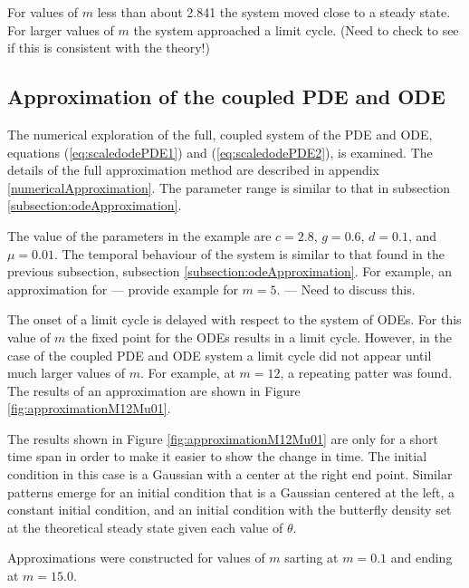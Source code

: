 \documentclass[12pt]{article}
\begin{document}
For values of $m$ less than about 2.841 the system moved close to a
steady state. For larger values of $m$ the system approached a limit
cycle. (Need to check to see if this is consistent with the theory!)

\subsection{Approximation of the coupled PDE and ODE}

The numerical exploration of the full, coupled system of the PDE and
ODE, equations (\ref{eq:scaledodePDE1}) and (\ref{eq:scaledodePDE2}),
is examined. The details of the full approximation method are
described in appendix \ref{numericalApproximation}. The parameter
range is similar to that in subsection
\ref{subsection:odeApproximation}.

The value of the parameters in the example are $c=2.8$, $g=0.6$,
$d=0.1$, and $\mu=0.01$. The temporal behaviour of the system is
similar to that found in the previous subsection, subsection
\ref{subsection:odeApproximation}. For example, an approximation for
--- provide example for $m=5$. --- Need to discuss this.

The onset of a limit cycle is delayed with respect to the system of
ODEs. For this value of $m$ the fixed point for the ODEs results in a
limit cycle. However, in the case of the coupled PDE and ODE system a
limit cycle did not appear until much larger values of $m$. For
example, at $m=12$, a repeating patter was found. The results of an
approximation are shown in Figure \ref{fig:approximationM12Mu01}.

The results shown in Figure \ref{fig:approximationM12Mu01} are only
for a short time span in order to make it easier to show the change in
time. The initial condition in this case is a Gaussian with a center
at the right end point.  Similar patterns emerge for an initial
condition that is a Gaussian centered at the left, a constant initial
condition, and an initial condition with the butterfly density set at
the theoretical steady state given each value of $\theta$.


Approximations were constructed for
values of $m$ sarting at $m=0.1$ and ending at $m=15.0$.
\end{document}
